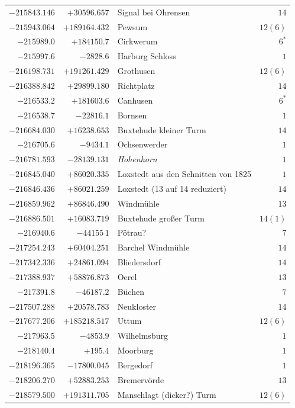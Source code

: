 \begin{center}
\begin{tabular}{r|r|p{170pt}|r}
\(-215843.146\)&\(+30596.657\)&Signal bei Ohrensen&\(14\)\\
\(-215943.064\)&\(+189164.432\)&Pewsum&\(12 (6)\)\\
\(-215989.0\)&\(+184150.7\)&Cirkwerum&\(6^{*}\)\\
\(-215997.6\)&\(-2828.6\)&Harburg Schloss&\(1\)\\
\(-216198.731\)&\(+191261.429\)&Grothusen&\(12 (6)\)\\
\(-216388.842\)&\(+29899.180\)&Richtplatz&\(14\)\\
\(-216533.2\)&\(+181603.6\)&Canhusen&\(6^{*}\)\\
\(-216538.7\)&\(-22816.1\)&Bornsen&\(1\)\\
\(-216684.030\)&\(+16238.653\)&Buxtehude kleiner Turm&\(14\)\\
\(-216705.6\)&\(-9434.1\)&Ochsenwerder&\(1\)\\
\(-216781.593\)&\(-28139.131\)&\textit{Hohenhorn}&\(1\)\\
\(-216845.040\)&\(+86020.335\)&Loxstedt aus den Schnitten von 1825&\(1\)\\
\(-216846.436\)&\(+86021.259\)&Loxstedt (13 auf 14 reduziert)&\(14\)\\
\(-216859.962\)&\(+86846.490\)&Windmühle&\(13\)\\
\(-216886.501\)&\(+16083.719\)&Buxtehude großer Turm&\(14 (1)\)\\
\(-216940.6\)&\(-44155\,1\)&Pötrau?&\(7\)\\
\(-217254.243\)&\(+60404.251\)&Barchel Windmühle&\(14\)\\
\(-217342.336\)&\(+24861.094\)&Bliedersdorf&\(14\)\\
\(-217388.937\)&\(+58876.873\)&Oerel&\(13\)\\
\(-217391.8\)&\(-46187.2\)&Büchen&\(7\)\\
\(-217507.288\)&\(+20578.783\)&Neukloster&\(14\)\\
\(-217677.206\)&\(+185218.517\)&Uttum&\(12 (6)\)\\
\(-217963.5\)&\(-4853.9\)&Wilhelmsburg&\(1\)\\
\(-218140.4\)&\(+195.4\)&Moorburg&\(1\)\\
\(-218196.365\)&\(-17800.045\)&Bergedorf&\(1\)\\
\(-218206.270\)&\(+52883.253\)&Bremervörde&\(13\)\\
\(-218579.500\)&\(+191311.705\)&Manschlagt (dicker?) Turm&\(12 (6)\)\\
\hline\end{tabular}\endgroup\end{center}

